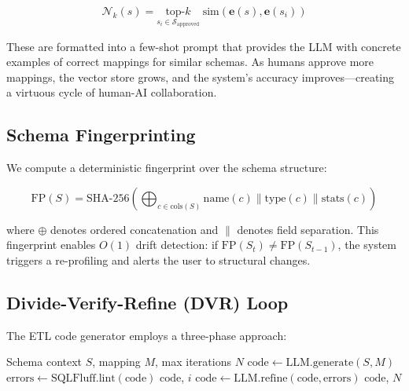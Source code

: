 \documentclass[conference]{IEEEtran}
\begin{document}
\begin{equation}
  \mathcal{N}_k(s) = \underset{s_i \in \mathcal{S}_{\text{approved}}}{\text{top-}k}
  \; \text{sim}(\mathbf{e}(s), \mathbf{e}(s_i))
  \label{eq:afsm}
\end{equation}

These are formatted into a few-shot prompt that provides the LLM with concrete
examples of correct mappings for similar schemas. As humans approve more
mappings, the vector store grows, and the system's accuracy improves---creating
a virtuous cycle of human-AI collaboration.

\subsection{Schema Fingerprinting}
\label{sec:fingerprint}

We compute a deterministic fingerprint over the schema structure:

\begin{equation}
  \text{FP}(S) = \text{SHA-256}\left(\bigoplus_{c \in \text{cols}(S)}
  \text{name}(c) \| \text{type}(c) \| \text{stats}(c)\right)
  \label{eq:fingerprint}
\end{equation}

where $\oplus$ denotes ordered concatenation and $\|$ denotes field
separation. This fingerprint enables $O(1)$ drift detection: if
$\text{FP}(S_t) \neq \text{FP}(S_{t-1})$, the system triggers a
re-profiling and alerts the user to structural changes.

\subsection{Divide-Verify-Refine (DVR) Loop}
\label{sec:dvr}

The ETL code generator employs a three-phase approach:

\begin{algorithm}[t]
\caption{Divide-Verify-Refine SQL Generation}
\label{alg:dvr}
\begin{algorithmic}[1]
\REQUIRE Schema context $S$, mapping $M$, max iterations $N$
\STATE $\text{code} \leftarrow \text{LLM.generate}(S, M)$
    \STATE $\text{errors} \leftarrow \text{SQLFluff.lint}(\text{code})$
        \RETURN $\text{code}$, $i$
    \ENDIF
    \STATE $\text{code} \leftarrow \text{LLM.refine}(\text{code}, \text{errors})$
\ENDFOR
\RETURN $\text{code}$, $N$
\end{algorithmic}
\end{algorithm}
\end{document}
